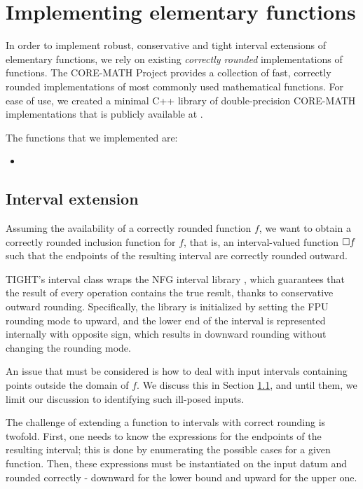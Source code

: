 
\section{Implementing elementary functions}
In order to implement robust, conservative and tight interval extensions of elementary functions, we rely on existing \emph{correctly rounded} implementations of functions.
The CORE-MATH Project \cite{} provides a collection of fast, correctly rounded implementations of most commonly used mathematical functions.
For ease of use, we created a minimal C++ library of double-precision CORE-MATH implementations that is publicly available at \url{}.

The functions that we implemented are:
\begin{itemize}
	\item
\end{itemize}

\subsection{Interval extension}
Assuming the availability of a correctly rounded function $f$, we want to obtain a correctly rounded inclusion function for $f$, that is, an interval-valued function $\Box f$ such that the endpoints of the resulting interval are correctly rounded outward.

TIGHT's interval class wraps the NFG interval library \cite{}, which guarantees that the result of every operation contains the true result, thanks to conservative outward rounding. Specifically, the library is initialized by setting the FPU rounding mode to upward, and the lower end of the interval is represented internally with opposite sign, which results in downward rounding without changing the rounding mode.

An issue that must be considered is how to deal with input intervals containing points outside the domain of $f$. We discuss this in Section \ref{}, and until them, we limit our discussion to identifying such ill-posed inputs.

The challenge of extending a function to intervals with correct rounding is twofold.
First, one needs to know the expressions for the endpoints of the resulting interval; this is done by enumerating the possible cases for a given function.
Then, these expressions must be instantiated on the input datum and rounded correctly - downward for the lower bound and upward for the upper one.

